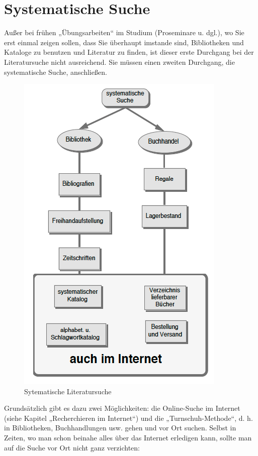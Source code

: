 \documentclass[]{book}
\theoremstyle{definition}
\theoremstyle{definition}
\theoremstyle{definition}
\theoremstyle{remark}
\begin{document}
\section{Systematische Suche}\label{systematische-suche}

Außer bei frühen „Übungsarbeiten`` im Studium (Proseminare u. dgl.), wo
Sie erst einmal zeigen sollen, dass Sie überhaupt imstande sind,
Bibliotheken und Kataloge zu benutzen und Literatur zu finden, ist
dieser erste Durchgang bei der Literatursuche nicht ausreichend. Sie
müssen einen zweiten Durchgang, die systematische Suche, anschließen.

\begin{figure}

{\centering \includegraphics{images/recherchieren-literatursuche-systematisch-min} 

}

\caption{Sytematische Literatursuche}\label{fig:unnamed-chunk-6}
\end{figure}

Grundsätzlich gibt es dazu zwei Möglichkeiten: die Online-Suche im
Internet (siehe Kapitel „Recherchieren im Internet``) und die
„Turnschuh-Methode``, d. h. in Bibliotheken, Buchhandlungen usw. gehen
und vor Ort suchen. Selbst in Zeiten, wo man schon beinahe alles über
das Internet erledigen kann, sollte man auf die Suche vor Ort nicht ganz
verzichten:
\end{document}
